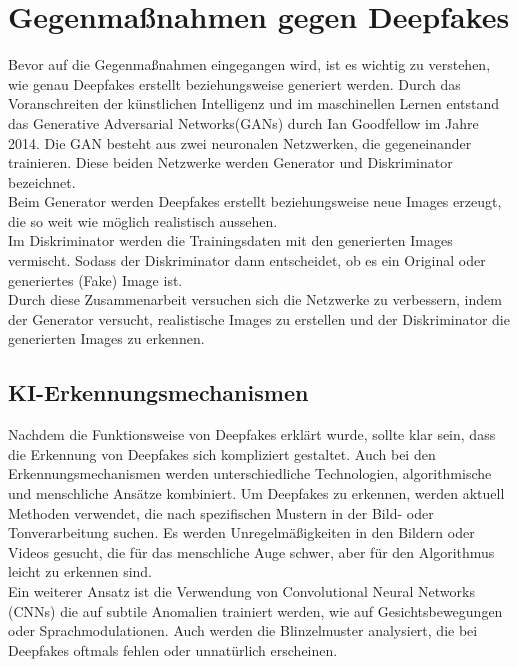 \documentclass[a4paper,12pt]{article}
\begin{document}
\section{Gegenmaßnahmen gegen Deepfakes}
Bevor auf die Gegenmaßnahmen eingegangen wird,
ist es wichtig zu verstehen, wie genau Deepfakes erstellt beziehungsweise generiert werden.
Durch das Voranschreiten der künstlichen Intelligenz und im maschinellen Lernen entstand
das Generative Adversarial Networks(GANs) durch Ian Goodfellow im Jahre 2014.
Die GAN besteht aus zwei neuronalen Netzwerken, die gegeneinander trainieren.
Diese beiden Netzwerke werden Generator und Diskriminator bezeichnet.\\
Beim Generator werden Deepfakes erstellt beziehungsweise neue Images erzeugt,
die so weit wie möglich realistisch aussehen.\\ 
Im Diskriminator werden die Trainingsdaten mit den generierten Images vermischt.
Sodass der Diskriminator dann entscheidet, ob es ein Original oder generiertes (Fake) Image ist.\\
Durch diese Zusammenarbeit versuchen sich die Netzwerke zu verbessern, indem der Generator versucht, realistische Images zu erstellen und der Diskriminator die generierten Images zu erkennen.\cite{BVDW2024}

\subsection{KI-Erkennungsmechanismen}\label{subsec:KI-Erkennungsmechanismen}
Nachdem die Funktionsweise von Deepfakes erklärt wurde, sollte klar sein,
dass die Erkennung von Deepfakes sich kompliziert gestaltet.
Auch bei den Erkennungsmechanismen werden unterschiedliche Technologien, algorithmische und menschliche Ansätze kombiniert.
Um Deepfakes zu erkennen, werden aktuell Methoden verwendet, die nach spezifischen Mustern in der Bild- oder Tonverarbeitung suchen.
Es werden Unregelmäßigkeiten in den Bildern oder Videos gesucht, die für das menschliche Auge schwer,
aber für den Algorithmus leicht zu erkennen sind.\\
Ein weiterer Ansatz ist die Verwendung von Convolutional Neural Networks (CNNs)
die auf subtile Anomalien trainiert werden, wie auf Gesichtsbewegungen oder Sprachmodulationen.
Auch werden die Blinzelmuster analysiert, die bei Deepfakes oftmals fehlen oder unnatürlich erscheinen.\cite{BVDW2024}
\end{document}
